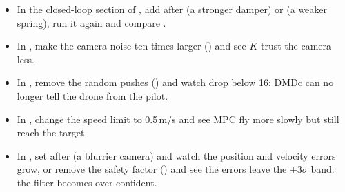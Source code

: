 \begin{itemize}
  \item In the closed-loop section of , add  after  (a stronger
        damper) or  (a weaker spring), run it again and compare .
  \item In , make the camera noise ten times larger () and see $K$ trust the camera less.
  \item In , remove the random pushes () and watch  drop below 16: DMDc can
        no longer tell the drone from the pilot.
  \item In , change the speed limit  to 0.5\,m/s and see MPC fly more slowly but still reach the target.
  \item In , set  after  (a blurrier camera) and watch the
        position and velocity errors grow, or remove the safety factor () and see the errors leave
        the $\pm3\sigma$ band: the filter becomes over-confident.
\end{itemize}

